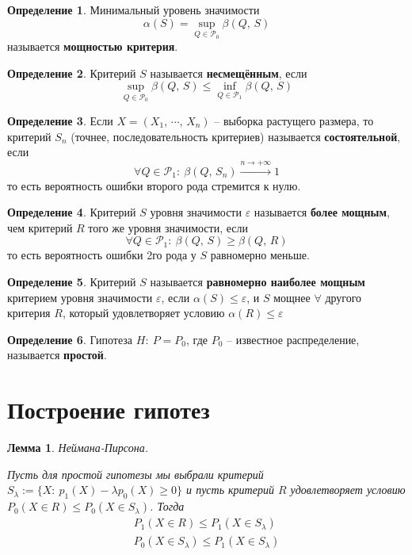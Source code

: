 \documentclass[a4paper,12pt]{article}
\renewcommand{\leq}{\ensuremath{\leqslant}}
\renewcommand{\geq}{\ensuremath{\geqslant}}
\theoremstyle{plain}
\newtheorem{lemma}{Лемма}[section]
\theoremstyle{definition}
\newtheorem{definition}{Определение}[section]
\theoremstyle{remark}
\begin{document}
\begin{definition}
  Минимальный уровень значимости 
  \[
    \alpha(S) = \sup_{Q \in \mathcal{P}_0}\beta(Q,\, S)
  \]
  называется \textbf{мощностью критерия}.
\end{definition}

\begin{definition}
  Критерий $S$ называется \textbf{несмещённым}, если
  \[
    \sup_{Q \in \mathcal{P}_0}\beta(Q,\,S) \leq \inf_{Q \in \mathcal{P}_1}\beta(Q,\, S)
  \]
\end{definition}

\begin{definition}
  Если $X = (X_1,\,\cdots,\,X_n)$ -- выборка растущего размера, то критерий $S_n$ (точнее, последовательность критериев) называется \textbf{состоятельной}, если
  \[
    \forall Q \in \mathcal{P}_1 :\: \beta(Q,\, S_n) \overset{n \to +\infty}{\to} 1  
  \]
  то есть вероятность ошибки второго рода стремится к нулю.
\end{definition}

\begin{definition}
  Критерий $S$ уровня значимости $\varepsilon$ называется \textbf{более мощным}, чем критерий $R$ того же уровня значимости, если
  \[
    \forall Q \in \mathcal{P}_1 :\: \beta(Q,\,S) \geq \beta(Q,\, R)
  \]
  то есть вероятность ошибки 2го рода у $S$ равномерно меньше.
\end{definition}

\begin{definition}
  Критерий $S$ называется \textbf{равномерно наиболее мощным} критерием уровня значимости $\varepsilon$, если $\alpha(S) \leq \varepsilon$, и $S$ мощнее $\forall$ другого критерия $R$, который удовлетворяет условию $\alpha(R) \leq \varepsilon$
\end{definition}

\begin{definition}
  Гипотеза $H :\: P = P_0$, где $P_0$ -- известное распределение, называется \textbf{простой}.
\end{definition}

\section{Построение гипотез}
\begin{lemma}
  Неймана-Пирсона.

  Пусть для простой гипотезы мы выбрали критерий $S_\lambda := \{X :\: p_1(X) - \lambda p_0(X) \geq 0\}$ и пусть критерий $R$ удовлетворяет условию $P_0(X \in R) \leq P_0(X \in S_\lambda)$. Тогда
  \begin{align*}
    P_1(X \in R) \leq P_1(X \in S_\lambda)\\
    P_0(X \in S_\lambda) \leq P_1(X \in S_\lambda)
  \end{align*}
\end{lemma}
\end{document}
